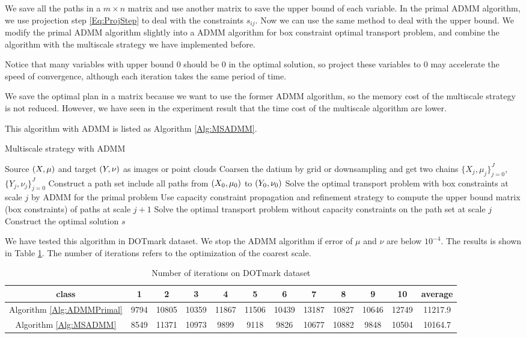 \documentclass[english]{pkupaper}
\begin{document}
We save all the paths in a $m \times n$ matrix and use another matrix to save the upper bound of each variable. In the primal ADMM algorithm, we use projection step \eqref{Eq:ProjStep} to deal with the constraints $s_{ij}$. Now we can use the same method to deal with the upper bound. We modify the primal ADMM algorithm slightly into a ADMM algorithm for box constraint optimal transport problem, and combine the algorithm with the multiscale strategy we have implemented before.

Notice that many variables with upper bound $0$ should be $0$ in the optimal solution, so project these variables to $0$ may accelerate the speed of convergence, although each iteration takes the same period of time.

We save the optimal plan in a matrix because we want to use the former ADMM algorithm, so the memory cost of the multiscale strategy is not reduced. However, we have seen in the experiment result that the time cost of the multiscale algorithm are lower.

This algorithm with ADMM is listed as Algorithm \ref{Alg:MSADMM}.

\begin{algorithm} 
\caption{Multiscale strategy with ADMM} \label{Alg:MSADMM}
\begin{algorithmic}
\REQUIRE Source $ \left(  X, \mu  \right) $ and target $ \left(  Y, \nu  \right) $ as images or point clouds
\STATE Coarsen the datium by grid or downsampling and get two chains $\{ X_j, \mu_j \}^J_{j=0}$,$\{Y_j, \nu_j\}^J_{j=0}$
\STATE Construct a path set include all paths from $\left( X_0, \mu_0 \right)$ to $\left( Y_0, \nu_0 \right)$
\STATE Solve the optimal transport problem with box constraints at scale $j$ by ADMM for the primal problem
\STATE Use capacity constraint propagation and refinement strategy to compute the upper bound matrix (box constraints) of paths at scale $j + 1$
\ENDFOR
\STATE Solve the optimal transport problem without capacity constraints on the path set at scale $j$
\STATE Construct the optimal solution $s$
\end{algorithmic}
\end{algorithm}

We have tested this algorithm in DOTmark dataset. We stop the ADMM algorithm if error of $\mu$ and $\nu$ are below $10^{-4}$. The results is shown in Table \ref{Tbl:ADOT}. The number of iterations refers to the optimization of the coarest scale.

\begin{table}[htbp]
\centering \footnotesize
\begin{tabular}{|c|c|c|c|c|c|c|c|c|c|c|c|}
\hline
class & 1 & 2 & 3 & 4 & 5 & 6 & 7 & 8 & 9 & 10 & average \\ \hline
Algorithm \ref{Alg:ADMMPrimal} & 9794 & 10805 & 10359 & 11867 & 11506 & 10439 &13187 & 10827 & 10646 & 12749 & 11217.9 \\ \hline 
Algorithm \ref{Alg:MSADMM} & 8549 & 11371 & 10973 & 9899 & 9118 & 9826 & 10677 & 10882 & 9848 & 10504 & 10164.7 \\ \hline
\end{tabular}
\caption{Number of iterations on DOTmark dataset} \label{Tbl:ADOT}
\end{table}
\end{document}
